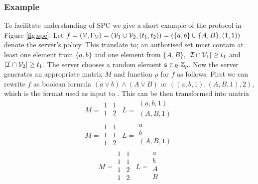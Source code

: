 \subsubsection{Example}\label{spc:example}
To facilitate understanding of \ac{SPC} we give a short example of the protocol in Figure \ref{fig:spc}.
Let $f=(\mathcal{V}, \Gamma_\mathcal{V})=(\mathcal{V}_1\cup\mathcal{V}_2, (t_1,t_2))=(\{a,b\}\cup\{A,B\}, (1,1))$ denote the server's policy.
This translate to; an authorised set must contain at least one element from $\{a,b\}$ and one element from $\{A,B\}$, \ie $|\mathcal{I}\cap\mathcal{V}_1|\geq t_1$ and $|\mathcal{I}\cap\mathcal{V}_2|\geq t_1$.
The server chooses a random element $\mathfrak{s}\in_R\mathbb{Z}_p$.
Now the server generates an appropriate matrix $M$ and function $\rho$ for $f$ as follows.
First we can rewrite $f$ as boolean formula $(a\vee b)\wedge(A\vee B)$ or $((a,b,1),(A,B,1),2)$, which is the format used as input to \citet[Algorithm 1]{LiuC10}.
This can be then transformed into matrix 
\[M=
\begin{matrix}
  1 & 1 \\
  1 & 2 \\
\end{matrix}
~~ L=
\begin{matrix}
  (a,b,1) \\
  (A,B,1) \\
\end{matrix}
\]
\[M=
\begin{matrix}
  1 & 1 \\
  1 & 1 \\
  1 & 2 \\
\end{matrix}
~~ L=
\begin{matrix}
  a \\
  b \\
  (A,B,1) \\
\end{matrix}
\]
\[M=
\begin{matrix}
  1 & 1 \\
  1 & 1 \\
  1 & 2 \\
  1 & 2 \\
\end{matrix}
~~ L=
\begin{matrix}
  a \\
  b \\
  A \\
  B \\
\end{matrix}
\]
